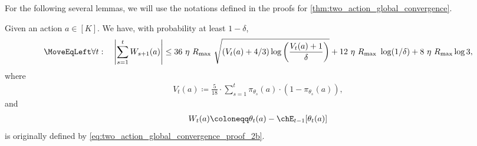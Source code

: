 For the following several lemmas, we will use the notations defined in the proofs for \cref{thm:two_action_global_convergence}.

\begin{lemma}
\label{lem:parameter_noise_concentration}
Given an action $a \in [K]$. We have, with probability at least $1 - \delta$,
\begin{align}
\label{eq:parameter_noise_concentration_claim_1}
\MoveEqLeft
    \forall t:\quad \left| \sum_{s=1}^t W_{s+1}(a) \right| \le  36 \ \eta \ R_{\max} \ \sqrt{  (V_t(a)+4/3)\log \left( \frac{  V_t(a)+1  }{ \delta } \right) } + 12 \ \eta \ R_{\max} \ \log(1/\delta) +  8 \ \eta \ R_{\max}\log 3,
\end{align}
where
\begin{align}
\label{eq:parameter_noise_concentration_claim_2}
    V_t(a) \coloneqq \frac{5}{18} \cdot \sum_{s=1}^t  \pi_{\theta_s}(a)\cdot (1-\pi_{\theta_s}(a)),
\end{align}
and 
\begin{align}
\label{eq:parameter_noise_concentration_claim_3}
    W_t(a) \coloneqq \theta_t(a) - \chE_{t-1}{[ \theta_t(a)]}
\end{align}
is originally defined by \cref{eq:two_action_global_convergence_proof_2b}.
\end{lemma}
